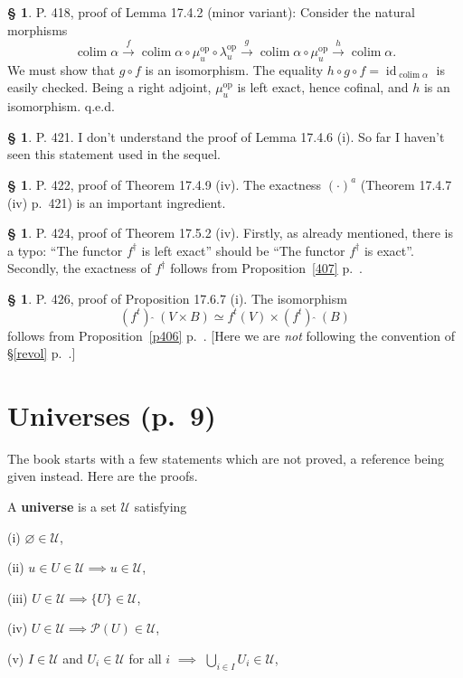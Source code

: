 \documentclass[12pt]{article}
\theoremstyle{remark}
\theoremstyle{definition}
\newtheorem{s}[thm]{\S}
\newcommand{\xr}{\xrightarrow}
\newcommand{\mv}{ (minor variant)}
\DeclareMathOperator*{\co}{colim}
\DeclareMathOperator{\id}{id}
\DeclareMathOperator{\op}{op}
\begin{document}
%
%
\begin{s} 
P. 418, proof of Lemma 17.4.2\mv: Consider the natural morphisms 
$$
\co\alpha\xr f\co\alpha\circ\mu_u^{\op}\circ\lambda_u^{\op}\xr g\co\alpha\circ\mu_u^{\op}\xr h\co\alpha.
$$
We must show that $g\circ f$ is an isomorphism. The equality $h\circ g\circ f=\id_{\co\alpha}$ is easily checked. Being a right adjoint, $\mu_u^{\op}$ is left exact, hence cofinal, and $h$ is an isomorphism. q.e.d.
\end{s}
%
%
\begin{s} 
P. 421. I don't understand the proof of Lemma 17.4.6 (i). So far I haven't seen this statement used in the sequel.
\end{s}
%
%
\begin{s} 
P. 422, proof of Theorem 17.4.9 (iv). The exactness $(\cdot)^a$ (Theorem 17.4.7 (iv) p.~421) is an important ingredient.
\end{s}
%
%
\begin{s} 
P. 424, proof of Theorem 17.5.2 (iv). Firstly, as already mentioned, there is a typo: ``The functor $f^\dagger$ is left exact'' should be ``The functor $f^\dagger$ is exact''. Secondly, the exactness of $f^\dagger$ follows from Proposition~\ref{407} p.~\pageref{407}.
\end{s}
%
%
\begin{s} 
P. 426, proof of Proposition 17.6.7 (i). The isomorphism 
$$
(f^t)\ \widehat{}\ (V\times B)\simeq f^t(V)\times(f^t)\ \widehat{}\ (B)
$$ 
follows from Proposition~\ref{p406} p.~\pageref{p406}. [Here we are {\em not} following the convention of \S\ref{revol} p.~\pageref{revol}.]
\end{s}
%
\section{Universes (p.~9)} %
%
The book starts with a few statements which are not proved, a reference being given instead. Here are the proofs.

A \textbf{universe} is a set $\mathcal U$ satisfying 

(i) $\varnothing\in\mathcal U$,

(ii) $u\in U\in\mathcal U\implies u\in \mathcal U$,

(iii) $U\in\mathcal U\implies\{U\}\in\mathcal U$,

(iv) $U\in\mathcal U\implies\mathcal P(U)\in\mathcal U$,

(v) $I\in\mathcal U$ and $U_i\in\mathcal U$ for all $i$ $\implies$ $\bigcup_{i\in I}U_i\in\mathcal U$,
\end{document}
